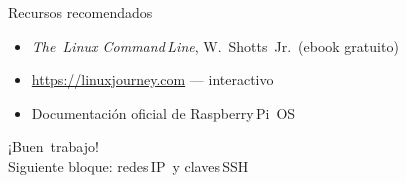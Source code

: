 \documentclass[aspectratio=169,professionalfonts]{beamer}
\begin{document}
\begin{frame}{Recursos recomendados}
\begin{itemize}
  \item \emph{The Linux Command Line}, W. Shotts Jr. (ebook gratuito)
  \item \url{https://linuxjourney.com} — interactivo
  \item Documentación oficial de Raspberry Pi OS
\end{itemize}
\end{frame}

\begin{frame}[plain]
  \centering \Huge ¡Buen trabajo!\\[1ex]
  Siguiente bloque: redes IP y claves SSH
\end{frame}
\end{document}
